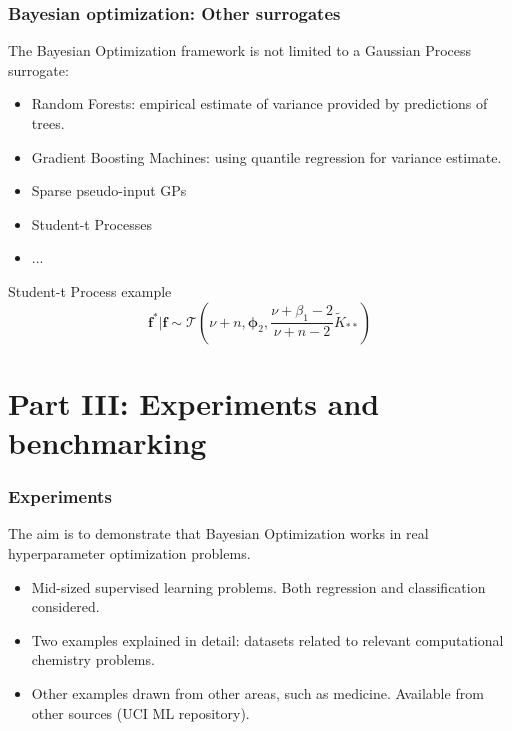 \documentclass[10pt,usenames,dvipsnames]{beamer}
\begin{document}
		\begin{frame}
		\frametitle{Bayesian optimization: Other surrogates}
		The Bayesian Optimization framework is not limited to a \textcolor{NavyBlue}{Gaussian Process} surrogate:
		\begin{itemize}
		\item Random Forests: empirical estimate of variance provided by predictions of trees.
		\item Gradient Boosting Machines: using quantile regression for variance estimate.
		\item Sparse pseudo-input GPs
		\item Student-t Processes
		\item ...
		\end{itemize}
		
		\begin{block}{Student-t Process example}
		\begin{equation}
		\boldsymbol{f}^*|\boldsymbol{f} \sim \mathcal{T}\left(\nu + n, \boldsymbol{\phi}_2, \dfrac{\nu + 				\beta_1 - 2}{\nu + n - 2} \tilde{K}_{**} \right)
		\end{equation}
		\end{block}
		\end{frame}
		
		\section{Part III: Experiments and benchmarking}
		
		\begin{frame}
			\frametitle{Experiments}
			The aim is to demonstrate that Bayesian Optimization works in real hyperparameter optimization problems.
			\begin{itemize}
				\item Mid-sized supervised learning problems. Both regression and classification considered.
				\item Two examples explained in detail: datasets related to relevant computational chemistry problems.
				\item Other examples drawn from other areas, such as medicine. Available from other sources (UCI ML repository).
			\end{itemize}
		\end{frame}
		
\end{document}
